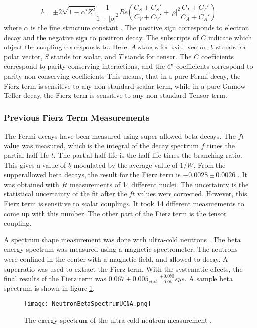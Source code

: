 \documentclass[../MaxHughesThesis.tex]{subfiles}
\begin{document}
\begin{equation}
	b =  \pm 2 \sqrt{1 - \alpha^{2}{Z^{2}}}\frac{1}{1 + |\rho|^{2}}Re(\frac{C_{S} + C_{S}'}{C_{V} + C_{V}'} + |\rho|^{2}\frac{C_{T} + C_{T}'}{C_{A} + C_{A}'})
	\label{eq:bwrittenout}
\end{equation}
where $\alpha$ is the fine structure constant \cite{Jack57}.
The positive sign corresponds to electron decay and the negative sign to positron decay.  
The subscripts of $C$ indicate which object the coupling corresponds to. 
Here, $A$ stands for axial vector, $V$ stands for polar vector, $S$ stands for scalar, and $T$ stands for tensor. 
The $C$ coefficients correspond to parity conserving interactions, and the $C'$ coefficients correspond to parity non-conserving coefficients \cite{Lee56}
This means, that in a pure Fermi decay, the Fierz term is sensitive to any non-standard scalar term, while in a pure Gamow-Teller decay, the Fierz term is sensitive to any non-standard Tensor term. 

\subsubsection{Previous Fierz Term Measurements}
The Fermi decays have been measured using super-allowed beta decays.
The $ft$ value was measured, which is the integral of the decay spectrum $f$ times the partial half-life $t$.
The partial half-life is the half-life times the branching ratio.
This gives a value of $b$ modulated by the average value of $1/W$.
From the supperallowed beta decays, the result for the Fierz term is $-0.0028 \pm 0.0026$ \cite{Har17}.
It was obtained with $ft$ measurements of 14 different nuclei.
The uncertainty is the statistical uncertainty of the fit after the $ft$ values were corrected.
However, this Fierz term is sensitive to scalar couplings.
It took 14 different measurements to come up with this number.
The other part of the Fierz term is the tensor coupling. 

A spectrum shape measurement was done with ultra-cold neutrons \cite{Hic17}.
The beta energy spectrum was measured using a magnetic spectrometer.
The neutrons were confined in the center with a magnetic field, and allowed to decay.
A superratio was used to extract the Fierz term.
With the systematic effects, the final results of the Fierz term was $0.067 \pm 0.005_{stat}$ $ ^{+0.090}_{-0.061} sys$.
A sample beta spectrum is shown in figure \ref{fig:ucnabeta}.

\begin{figure}[!htb]
        \centerline{\texttt{[image: NeutronBetaSpectrumUCNA.png]}}
        \caption{The energy spectrum of the ultra-cold neutron measurement \cite{Hic17}. }
        \label{fig:ucnabeta}
\end{figure}
\end{document}
